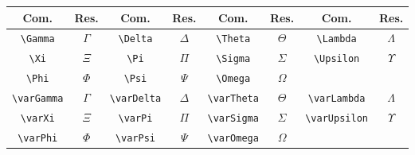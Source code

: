 % 
% 
% 
% 
% 
\begin{tabular}{cc|cc|cc|cc}
    \hline
    Com. & Res. & Com. & Res. & Com. & Res. & Com. & Res. \\ \hline
    \lstinline!\Gamma! & $\Gamma$ & \lstinline!\Delta! & $\Delta$ & \lstinline!\Theta! & $\Theta$ & \lstinline!\Lambda! & $\Lambda$ \\
    \lstinline!\Xi! & $\Xi$ & \lstinline!\Pi! & $\Pi$ & \lstinline!\Sigma! & $\Sigma$ & \lstinline!\Upsilon! & $\Upsilon$ \\
    \lstinline!\Phi! & $\Phi$ & \lstinline!\Psi! & $\Psi$ & \lstinline!\Omega! & $\Omega$ \\
    \lstinline!\varGamma! & $\varGamma$ & \lstinline!\varDelta! & $\varDelta$ & \lstinline!\varTheta! & $\varTheta$ & \lstinline!\varLambda! & $\varLambda$ \\
    \lstinline!\varXi! & $\varXi$ & \lstinline!\varPi! & $\varPi$ & \lstinline!\varSigma! & $\varSigma$ & \lstinline!\varUpsilon! & $\varUpsilon$ \\
    \lstinline!\varPhi! & $\varPhi$ & \lstinline!\varPsi! & $\varPsi$ &
    \lstinline!\varOmega! & $\varOmega$ & & \\ \hline
\end{tabular}
